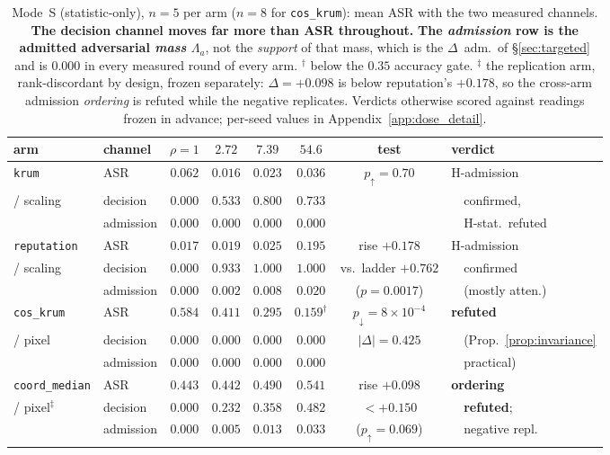 \documentclass{article}
\begin{document}
\begin{table}[h]
\caption{Mode~S (statistic-only), $n{=}5$ per arm ($n{=}8$ for \texttt{cos\_krum}): mean ASR with the two measured channels. \textbf{The decision channel moves far more than ASR throughout.} \textbf{The \emph{admission} row is the admitted adversarial \emph{mass} $\Lambda_a$}, not the \emph{support} of that mass, which is the $\Delta$~adm.\ of §\ref{sec:targeted} and is $0.000$ in every measured round of every arm. $^{\dagger}$ below the $0.35$ accuracy gate. $^{\ddagger}$ the replication arm, rank-discordant by design, frozen separately: $\Delta{=}{+}0.098$ is below reputation's $+0.178$, so the cross-arm admission \emph{ordering} is refuted while the negative replicates. Verdicts otherwise scored against readings frozen in advance; per-seed values in Appendix~\ref{app:dose_detail}.}
\label{tab:targeted}
\centering\scriptsize\setlength{\tabcolsep}{4pt}
\begin{tabular}{llcccccl}
\toprule
\textbf{arm} & \textbf{channel} & $\rho{=}1$ & $2.72$ & $7.39$ & $54.6$ & \textbf{test} & \textbf{verdict} \\
\midrule
\texttt{krum} & ASR & $0.062$ & $0.016$ & $0.023$ & $0.036$ & $p_{\uparrow}{=}0.70$ & H-admission \\
/ scaling & decision & $0.000$ & $0.533$ & $0.800$ & $0.733$ & & \ \ confirmed, \\
 & admission & $0.000$ & $0.000$ & $0.000$ & $0.000$ & & \ \ H-stat.\ refuted \\
\midrule
\texttt{reputation} & ASR & $0.017$ & $0.019$ & $0.025$ & $0.195$ & rise $+0.178$ & H-admission \\
/ scaling & decision & $0.000$ & $0.933$ & $1.000$ & $1.000$ & vs.\ ladder $+0.762$ & \ \ confirmed \\
 & admission & $0.000$ & $0.002$ & $0.008$ & $0.020$ & ($p{=}0.0017$) & \ \ (mostly atten.) \\
\midrule
\texttt{cos\_krum} & ASR & $0.584$ & $0.411$ & $0.295$ & $0.159^{\dagger}$ & $p_{\downarrow}{=}8{\times}10^{-4}$ & \textbf{refuted} \\
/ pixel & decision & $0.000$ & $0.000$ & $0.000$ & $0.000$ & $|\Delta|{=}0.425$ & \ \ (Prop.~\ref{prop:invariance} \\
 & admission & $0.000$ & $0.000$ & $0.000$ & $0.000$ & & \ \ practical) \\
\midrule
\texttt{coord\_median} & ASR & $0.443$ & $0.442$ & $0.490$ & $0.541$ & rise $+0.098$ & \textbf{ordering} \\
/ pixel$^{\ddagger}$ & decision & $0.000$ & $0.232$ & $0.358$ & $0.482$ & $<{+}0.150$ & \ \ \textbf{refuted}; \\
 & admission & $0.000$ & $0.005$ & $0.013$ & $0.033$ & ($p_{\uparrow}{=}0.069$) & \ \ negative repl. \\
\bottomrule
\end{tabular}
\end{table}
\end{document}
